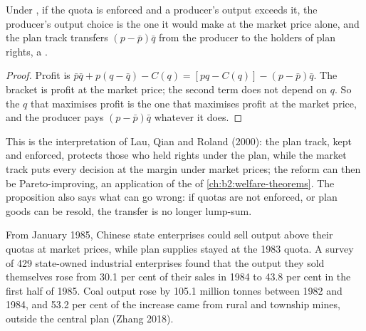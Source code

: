 \begin{proposition}\label{prop:b2:prices-as-information:dual-track}
Under , if the quota is enforced and a producer's output exceeds it, the producer's
output choice is the one it would make at the market price alone, and the plan track transfers $(p - \bar
p)\bar q$ from the producer to the holders of plan rights, a .
\end{proposition}

\begin{proof}
Profit is $\bar p\bar q + p(q - \bar q) - C(q) = [pq - C(q)] - (p - \bar p)\bar q$. The bracket is profit at the
market price; the second term does not depend on $q$. So the $q$ that maximises profit is the one that
maximises profit at the market price, and the producer pays $(p - \bar p)\bar q$ whatever it does.
\end{proof}

This is the interpretation of Lau, Qian and Roland (2000): the plan track, kept and enforced, protects
those who held rights under the plan, while the market track puts every decision at the margin under
market prices; the reform can then be Pareto-improving, an application of the  of
\cref{ch:b2:welfare-theorems}. The proposition also says what can go wrong: if quotas are not enforced,
or plan goods can be resold, the transfer is no longer lump-sum.

\begin{record}
From January 1985, Chinese state enterprises could sell output above their quotas at market prices, while
plan supplies stayed at the 1983 quota. A survey of 429 state-owned industrial enterprises found that
the output they sold themselves rose from 30.1 per cent of their sales in 1984 to 43.8 per cent in the
first half of 1985. Coal output rose by 105.1 million tonnes between 1982 and 1984, and 53.2 per cent of
the increase came from rural and township mines, outside the central plan (Zhang 2018).
\end{record}

